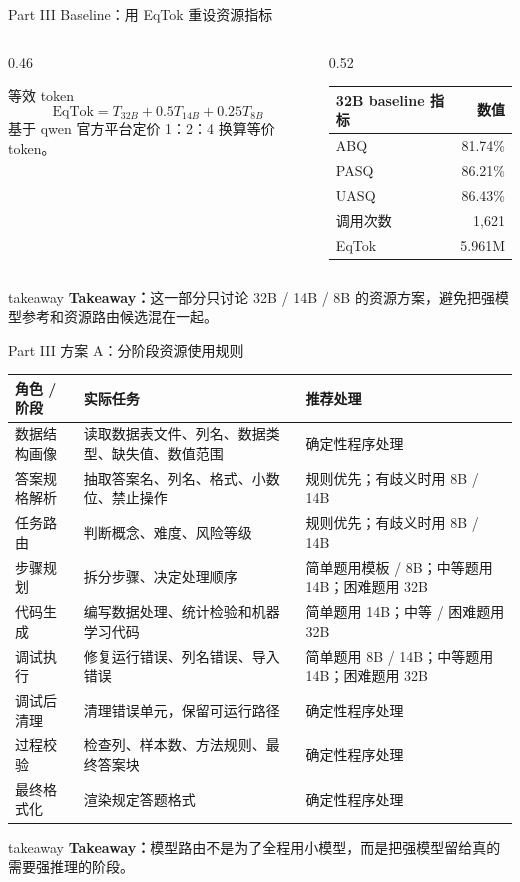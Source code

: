 \documentclass[aspectratio=169,UTF8]{ctexbeamer}
\renewcommand{\arraystretch}{1.14}
\newcommand{\takeaway}[1]{%
  \vspace{0.18em}
  \begin{beamercolorbox}[wd=\textwidth,sep=0.42ex,rounded=true,leftskip=0.75em,rightskip=0.75em]{takeaway}
    \scriptsize\textbf{\textcolor{DWBlue}{Takeaway：}}#1
  \end{beamercolorbox}
}
\begin{document}
\begin{frame}{Part III Baseline：用 EqTok 重设资源指标}
\begin{columns}[T]
\begin{column}{0.46\textwidth}
\begin{block}{等效 token}
\[
\mathrm{EqTok}=T_{32B}+0.5T_{14B}+0.25T_{8B}
\]
\footnotesize
基于 qwen 官方平台定价 1：2：4 换算等价 token。
\end{block}
\end{column}
\begin{column}{0.52\textwidth}
\footnotesize
\begin{tabularx}{\textwidth}{X r}
\toprule
32B baseline 指标 & 数值 \\
\midrule
ABQ & 81.74\% \\
PASQ & 86.21\% \\
UASQ & 86.43\% \\
调用次数 & 1,621 \\
EqTok & 5.961M \\
\bottomrule
\end{tabularx}
\end{column}
\end{columns}
\takeaway{这一部分只讨论 32B / 14B / 8B 的资源方案，避免把强模型参考和资源路由候选混在一起。}
\end{frame}

\begin{frame}{Part III 方案 A：分阶段资源使用规则}
\scriptsize
{\setlength{\tabcolsep}{3pt}
\renewcommand{\arraystretch}{1.12}
\begin{tabularx}{\textwidth}{>{\raggedright\arraybackslash}p{} >{\raggedright\arraybackslash}X >{\raggedright\arraybackslash}p{}}
\toprule
角色 / 阶段 & 实际任务 & 推荐处理 \\
\midrule
数据结构画像 & 读取数据表文件、列名、数据类型、缺失值、数值范围 & 确定性程序处理 \\
答案规格解析 & 抽取答案名、列名、格式、小数位、禁止操作 & 规则优先；有歧义时用 8B / 14B \\
任务路由 & 判断概念、难度、风险等级 & 规则优先；有歧义时用 8B / 14B \\
步骤规划 & 拆分步骤、决定处理顺序 & 简单题用模板 / 8B；中等题用 14B；困难题用 32B \\
代码生成 & 编写数据处理、统计检验和机器学习代码 & 简单题用 14B；中等 / 困难题用 32B \\
调试执行 & 修复运行错误、列名错误、导入错误 & 简单题用 8B / 14B；中等题用 14B；困难题用 32B \\
调试后清理 & 清理错误单元，保留可运行路径 & 确定性程序处理 \\
过程校验 & 检查列、样本数、方法规则、最终答案块 & 确定性程序处理 \\
最终格式化 & 渲染规定答题格式 & 确定性程序处理 \\
\bottomrule
\end{tabularx}
}
\vfill
\takeaway{模型路由不是为了全程用小模型，而是把强模型留给真的需要强推理的阶段。}
\end{frame}
\end{document}
